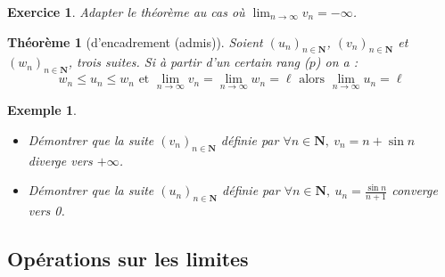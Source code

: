 \documentclass[12pt,a4paper]{article}
\newcommand{\N}{\mathbf{N}}
\theoremstyle{break}
\newtheorem{theoreme}{Théorème}
\theoremstyle{plain}
\newtheorem{exercice}{Exercice}
\theoremstyle{nonumberplain}
\theoremstyle{nonumberbreak}
\newtheorem{exemple}{Exemple}
\begin{document}

\begin{exercice}
  Adapter le théorème au cas où $\lim_{n\to\infty} v_n = -\infty$.

\end{exercice}

\begin{theoreme}[d'encadrement (admis)]
  Soient $(u_n)_{n\in\N}$, $(v_n)_{n\in\N}$ et $(w_n)_{n\in\N}$, trois
  suites. Si à partir d'un certain rang ($p$) on a : \[ w_n \leq u_n
    \leq w_n \text{ et } \lim_{n\to\infty} v_n = \lim_{n\to\infty}w_n =
  \ell \text{ alors } \lim_{n\to\infty} u_n = \ell \]
\end{theoreme}

\begin{exemple}
  \begin{itemize}
    \item Démontrer que la suite $(v_n)_{n\in\N}$ définie par $\forall
      n\in\N,\ v_n = n + \sin n $ diverge vers $+\infty$.

    \item Démontrer que la suite $(u_n)_{n\in\N}$ définie par $\forall
      n\in\N,\ u_n = \frac{\sin n}{n + 1} $ converge vers 0.

  \end{itemize}
\end{exemple}

\subsection{Opérations sur les limites}
\end{document}
